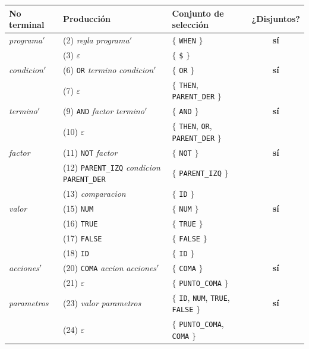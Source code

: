 \begin{longtable}{@{}>{\raggedright\arraybackslash}p{2.3cm} >{\raggedright\arraybackslash}p{4.0cm} >{\raggedright\arraybackslash}p{5.9cm} c@{}}
\toprule
\textbf{No terminal} & \textbf{Producción} & \textbf{Conjunto de selección} & \textbf{¿Disjuntos?} \\
\midrule
\endhead
\textit{programa}$'$ & (2)  \textit{regla} \textit{programa}$'$ & $\{$ \texttt{WHEN} $\}$ & \textbf{sí} \\
 & (3)  $\varepsilon$ & $\{$ \texttt{\$} $\}$ &  \\
\midrule
\textit{condicion}$'$ & (6)  \texttt{OR} \textit{termino} \textit{condicion}$'$ & $\{$ \texttt{OR} $\}$ & \textbf{sí} \\
 & (7)  $\varepsilon$ & $\{$ \texttt{THEN}, \texttt{PARENT\_DER} $\}$ &  \\
\midrule
\textit{termino}$'$ & (9)  \texttt{AND} \textit{factor} \textit{termino}$'$ & $\{$ \texttt{AND} $\}$ & \textbf{sí} \\
 & (10)  $\varepsilon$ & $\{$ \texttt{THEN}, \texttt{OR}, \texttt{PARENT\_DER} $\}$ &  \\
\midrule
\textit{factor} & (11)  \texttt{NOT} \textit{factor} & $\{$ \texttt{NOT} $\}$ & \textbf{sí} \\
 & (12)  \texttt{PARENT\_IZQ} \textit{condicion} \texttt{PARENT\_DER} & $\{$ \texttt{PARENT\_IZQ} $\}$ &  \\
 & (13)  \textit{comparacion} & $\{$ \texttt{ID} $\}$ &  \\
\midrule
\textit{valor} & (15)  \texttt{NUM} & $\{$ \texttt{NUM} $\}$ & \textbf{sí} \\
 & (16)  \texttt{TRUE} & $\{$ \texttt{TRUE} $\}$ &  \\
 & (17)  \texttt{FALSE} & $\{$ \texttt{FALSE} $\}$ &  \\
 & (18)  \texttt{ID} & $\{$ \texttt{ID} $\}$ &  \\
\midrule
\textit{acciones}$'$ & (20)  \texttt{COMA} \textit{accion} \textit{acciones}$'$ & $\{$ \texttt{COMA} $\}$ & \textbf{sí} \\
 & (21)  $\varepsilon$ & $\{$ \texttt{PUNTO\_COMA} $\}$ &  \\
\midrule
\textit{parametros} & (23)  \textit{valor} \textit{parametros} & $\{$ \texttt{ID}, \texttt{NUM}, \texttt{TRUE}, \texttt{FALSE} $\}$ & \textbf{sí} \\
 & (24)  $\varepsilon$ & $\{$ \texttt{PUNTO\_COMA}, \texttt{COMA} $\}$ &  \\
\bottomrule
\end{longtable}

